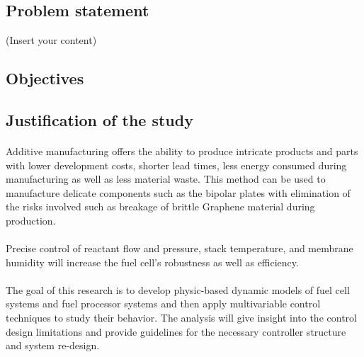 \subsection{Problem statement}
(Insert your content)
\subsection{Objectives}
\cite{stewart_platform_1965}
\subsection{Justification of the study}
\paragraph{}Additive manufacturing offers the ability to produce intricate products and parts with lower development costs, shorter lead times, less energy consumed during manufacturing as well as less material waste. This method can be used to manufacture delicate components such as the bipolar plates with elimination of the risks involved such as breakage of brittle Graphene material during production.     
\paragraph{}Precise control of reactant flow and pressure, stack temperature, and membrane humidity will increase the fuel cell’s robustness as well as efficiency.
\paragraph{}The goal of this research is to develop physic-based dynamic models of fuel cell systems and fuel processor systems and then apply multivariable control techniques to study their behavior. The analysis will give insight into the control design limitations and provide guidelines for the necessary controller structure and system re-design.
